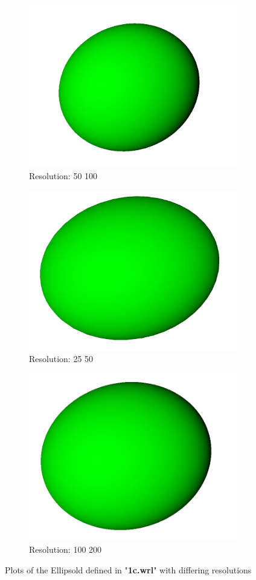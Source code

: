 \documentclass[acmlarge,nonacm=true]{acmart}
\begin{document}
\begin{figure}[H]
	\begin{subfigure}{.33\textwidth}
	  \centering
	  \includegraphics[width=.8\linewidth]{fig/1c50_100}
	  \caption{Resolution: 50 100}
	\end{subfigure}%
	\begin{subfigure}{.33\textwidth}
	  \centering
	  \includegraphics[width=.8\linewidth]{fig/1c25_50}
	  \caption{Resolution: 25 50}
	\end{subfigure}
	\begin{subfigure}{.33\textwidth}
		\centering
		\includegraphics[width=.8\linewidth]{fig/1c100_200}
		\caption{Resolution: 100 200}
	  \end{subfigure}
	\caption{Plots of the Ellipsold defined in "\textbf{1c.wrl}" with differing resolutions}
	\label{fig:1c}
\end{figure}
\end{document}
